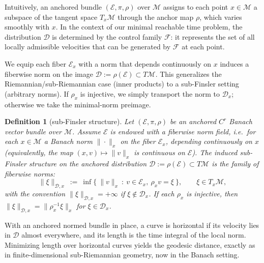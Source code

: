 \documentclass[12pt]{amsart}
\numberwithin{equation}{section}
\newtheorem{definition}{Definition}[section]
\theoremstyle{remark}
\begin{document}
Intuitively, an anchored bundle $(\mathcal E,\pi,\rho)$ over $\mathcal M$ assigns to each point $x\in \mathcal M$ a subspace of the tangent space $T_x\mathcal M$ through the anchor map $\rho$, which varies smoothly with $x$. In the context of our minimal reachable time problem, the distribution $\mathcal D$ is determined by the control family $\mathcal F$: it represents the set of all locally admissible velocities that can be generated by $\mathcal F$ at each point.

We equip each fiber $\mathcal E_x$ with a norm that depends continuously on $x$ induces a fiberwise norm on the image
$\mathcal D:=\rho(\mathcal E)\subset T\mathcal M$.
This generalizes the Riemannian/sub-Riemannian case (inner products) to a sub-Finsler setting (arbitrary norms).
If $\rho_x$ is injective, we simply transport the norm to $\mathcal D_x$; otherwise we take the minimal-norm preimage.

\begin{definition}[sub-Finsler structure]
Let $(\mathcal E,\pi,\rho)$ be an anchored $C^r$ Banach vector bundle over $\mathcal M$.
Assume $\mathcal E$ is endowed with a \emph{fiberwise norm field}, i.e.\ for each $x\in\mathcal M$ a Banach norm
$\|\cdot\|_{x}$ on the fiber $\mathcal E_x$, depending continuously on $x$ (equivalently, the map
$(x,v)\mapsto\|v\|_{x}$ is continuous on $\mathcal E$).
The induced sub-Finsler structure on the anchored distribution $\mathcal D:=\rho(\mathcal E)\subset T\mathcal M$ is the family of fiberwise norms:
\begin{equation}
\|\xi\|_{\mathcal D,x}\ :=\ \inf\big\{\ \|v\|_{x}\ :\ v\in \mathcal E_x,\ \rho_x v=\xi\ \big\},\qquad \xi\in T_x\mathcal M,
\end{equation}
with the convention $\|\xi\|_{\mathcal D,x}=+\infty$ if $\xi\notin\mathcal D_x$.
If each $\rho_x$ is injective, then $\|\xi\|_{\mathcal D,x}=\|\rho_x^{-1}\xi\|_{x}$ for $\xi\in\mathcal D_x$.
\end{definition}

With an anchored normed bundle in place, a curve is horizontal if its velocity lies in $\mathcal D$ almost everywhere,
and its length is the time integral of the local norm.
Minimizing length over horizontal curves yields the geodesic distance, exactly as in finite-dimensional sub-Riemannian geometry, now in the Banach setting.
\end{document}
